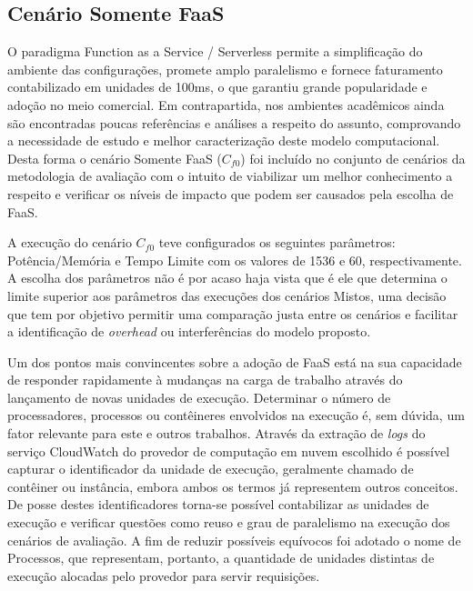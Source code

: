 \documentclass[english,brazilian]{UNISINOSmonografia} %
\begin{document}






\subsection{Cenário Somente FaaS}
\label{sec:resultados-modelo-faas}



O paradigma Function as a Service / Serverless permite a simplificação do ambiente das configurações, promete amplo paralelismo e fornece faturamento contabilizado em unidades de 100ms, o que garantiu grande popularidade e adoção no meio comercial.
%
Em contrapartida, nos ambientes acadêmicos ainda são encontradas poucas referências e análises a respeito do assunto, comprovando a necessidade de estudo e melhor caracterização deste modelo computacional.
%
Desta forma o cenário Somente FaaS ($C_{f0}$) foi incluído no conjunto de cenários da metodologia de avaliação com o intuito de viabilizar um melhor conhecimento a respeito e verificar os níveis de impacto que podem ser causados pela escolha de FaaS.



A execução do cenário $C_{f0}$ teve configurados os seguintes parâmetros: Potência/Memória e Tempo Limite com os valores de 1536 e 60, respectivamente.
%
A escolha dos parâmetros não é por acaso haja vista que é ele que determina o limite superior aos parâmetros das execuções dos cenários Mistos, uma decisão que tem por objetivo permitir uma comparação justa entre os cenários e facilitar a identificação de \textit{overhead} ou interferências do modelo proposto.



Um dos pontos mais convincentes sobre a adoção de FaaS está na sua capacidade de responder rapidamente à mudanças na carga de trabalho através do lançamento de novas unidades de execução.
%
Determinar o número de processadores, processos ou contêineres envolvidos na execução é, sem dúvida, um fator relevante para este e outros trabalhos.
%
Através da extração de \textit{logs} do serviço CloudWatch do provedor de computação em nuvem escolhido é possível capturar o identificador da unidade de execução, geralmente chamado de contêiner ou instância, embora ambos os termos já representem outros conceitos.
%
De posse destes identificadores torna-se possível contabilizar as unidades de execução e verificar questões como reuso e grau de paralelismo na execução dos cenários de avaliação.
%
A fim de reduzir possíveis equívocos foi adotado o nome de Processos, que representam, portanto, a quantidade de unidades distintas de execução alocadas pelo provedor para servir requisições.
\end{document}
